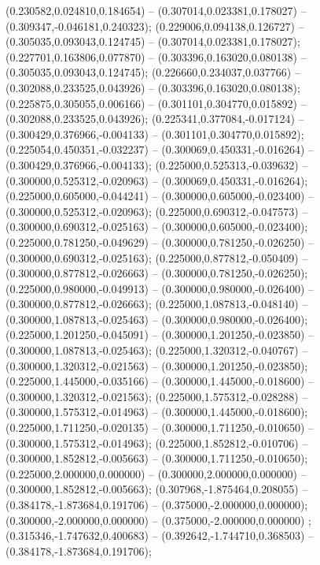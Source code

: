  (0.230582,0.024810,0.184654) -- (0.307014,0.023381,0.178027) -- (0.309347,-0.046181,0.240323);
 (0.229006,0.094138,0.126727) -- (0.305035,0.093043,0.124745) -- (0.307014,0.023381,0.178027);
 (0.227701,0.163806,0.077870) -- (0.303396,0.163020,0.080138) -- (0.305035,0.093043,0.124745);
 (0.226660,0.234037,0.037766) -- (0.302088,0.233525,0.043926) -- (0.303396,0.163020,0.080138);
 (0.225875,0.305055,0.006166) -- (0.301101,0.304770,0.015892) -- (0.302088,0.233525,0.043926);
 (0.225341,0.377084,-0.017124) -- (0.300429,0.376966,-0.004133) -- (0.301101,0.304770,0.015892);
 (0.225054,0.450351,-0.032237) -- (0.300069,0.450331,-0.016264) -- (0.300429,0.376966,-0.004133);
 (0.225000,0.525313,-0.039632) -- (0.300000,0.525312,-0.020963) -- (0.300069,0.450331,-0.016264);
 (0.225000,0.605000,-0.044241) -- (0.300000,0.605000,-0.023400) -- (0.300000,0.525312,-0.020963);
 (0.225000,0.690312,-0.047573) -- (0.300000,0.690312,-0.025163) -- (0.300000,0.605000,-0.023400);
 (0.225000,0.781250,-0.049629) -- (0.300000,0.781250,-0.026250) -- (0.300000,0.690312,-0.025163);
 (0.225000,0.877812,-0.050409) -- (0.300000,0.877812,-0.026663) -- (0.300000,0.781250,-0.026250);
 (0.225000,0.980000,-0.049913) -- (0.300000,0.980000,-0.026400) -- (0.300000,0.877812,-0.026663);
 (0.225000,1.087813,-0.048140) -- (0.300000,1.087813,-0.025463) -- (0.300000,0.980000,-0.026400);
 (0.225000,1.201250,-0.045091) -- (0.300000,1.201250,-0.023850) -- (0.300000,1.087813,-0.025463);
 (0.225000,1.320312,-0.040767) -- (0.300000,1.320312,-0.021563) -- (0.300000,1.201250,-0.023850);
 (0.225000,1.445000,-0.035166) -- (0.300000,1.445000,-0.018600) -- (0.300000,1.320312,-0.021563);
 (0.225000,1.575312,-0.028288) -- (0.300000,1.575312,-0.014963) -- (0.300000,1.445000,-0.018600);
 (0.225000,1.711250,-0.020135) -- (0.300000,1.711250,-0.010650) -- (0.300000,1.575312,-0.014963);
 (0.225000,1.852812,-0.010706) -- (0.300000,1.852812,-0.005663) -- (0.300000,1.711250,-0.010650);
 (0.225000,2.000000,0.000000) -- (0.300000,2.000000,0.000000) -- (0.300000,1.852812,-0.005663);
 (0.307968,-1.875464,0.208055) -- (0.384178,-1.873684,0.191706) -- (0.375000,-2.000000,0.000000);
 (0.300000,-2.000000,0.000000) -- (0.375000,-2.000000,0.000000) ;
 (0.315346,-1.747632,0.400683) -- (0.392642,-1.744710,0.368503) -- (0.384178,-1.873684,0.191706);

